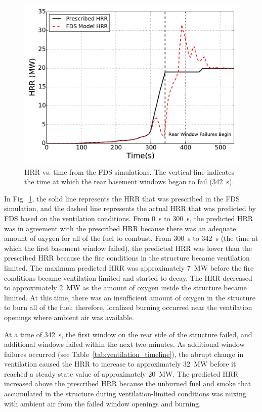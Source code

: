 \documentclass[12pt,oneside]{book}
\begin{document}
\begin{figure}[!ht]
\includegraphics[width=5.5in]{../Figures/Fire_HRR_w_FDS}
\caption[HRR vs. time from the FDS simulations.]
{HRR vs. time from the FDS simulations. The vertical line indicates the time at which the rear basement windows began to fail (342~s).}
\label{fig:hrr_w_fds}
\end{figure}


\clearpage


In Fig.~\ref{fig:hrr_w_fds}, the solid line represents the HRR that was prescribed in the FDS simulation, and the dashed line represents the actual HRR that was predicted by FDS based on the ventilation conditions. From 0~s to 300~s, the predicted HRR was in agreement with the prescribed HRR because there was an adequate amount of oxygen for all of the fuel to combust. From 300~s to 342~s (the time at which the first basement window failed), the predicted HRR was lower than the prescribed HRR because the fire conditions in the structure became ventilation limited. The maximum predicted HRR was approximately 7~MW before the fire conditions became ventilation limited and started to decay. The HRR decreased to approximately 2~MW as the amount of oxygen inside the structure became limited. At this time, there was an insufficient amount of oxygen in the structure to burn all of the fuel; therefore, localized burning occurred near the ventilation openings where ambient air was available.

At a time of 342~s, the first window on the rear side of the structure failed, and additional windows failed within the next two minutes. As additional window failures occurred (see Table~\ref{tab:ventilation_timeline}), the abrupt change in ventilation caused the HRR to increase to approximately 32~MW before it reached a steady-state value of approximately 20~MW. The predicted HRR increased above the prescribed HRR because the unburned fuel and smoke that accumulated in the structure during ventilation-limited conditions was mixing with ambient air from the failed window openings and burning.
\end{document}

